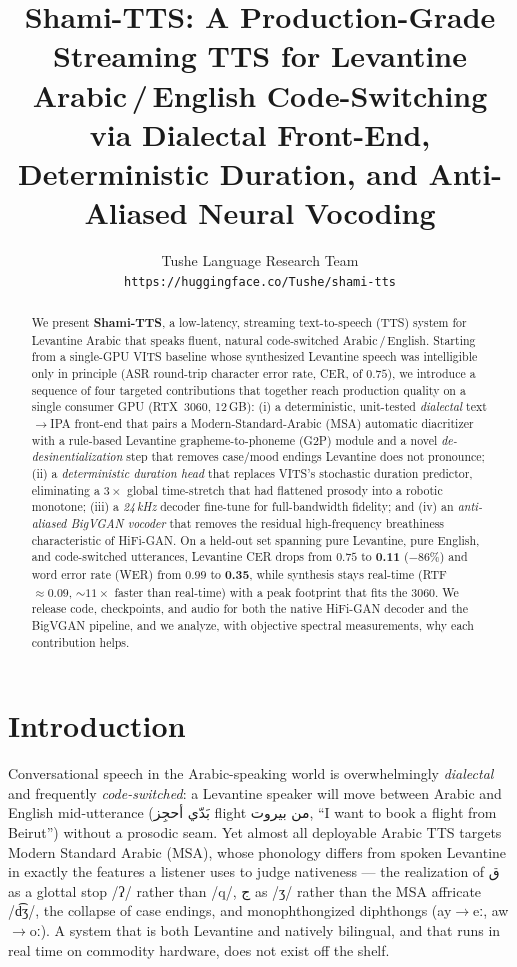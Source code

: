 \documentclass[10pt,twocolumn]{article}
\title{\vspace{-3.5em}\bfseries Shami-TTS: A Production-Grade Streaming TTS for
Levantine Arabic\,/\,English Code-Switching\\[0.2em]
\large via Dialectal Front-End, Deterministic Duration, and Anti-Aliased Neural Vocoding}
\author{Tushe Language Research Team\\ \small \texttt{https://huggingface.co/Tushe/shami-tts}}
\date{}
\newcommand{\ipa}[1]{{\ipafont #1}}
\newcommand{\ar}[1]{{\arabicfont #1}}
\newcommand{\best}[1]{\textbf{#1}}
\begin{document}
\maketitle

\begin{abstract}
\noindent
We present \textbf{Shami-TTS}, a low-latency, streaming text-to-speech (TTS) system for
Levantine Arabic that speaks fluent, natural code-switched Arabic\,/\,English. Starting
from a single-GPU VITS baseline whose synthesized Levantine speech was intelligible only
in principle (ASR round-trip character error rate, CER, of \(0.75\)), we introduce a
sequence of four targeted contributions that together reach production quality on a single
consumer GPU (RTX~3060, 12\,GB): (i) a deterministic, unit-tested \emph{dialectal}
text\(\rightarrow\)IPA front-end that pairs a Modern-Standard-Arabic (MSA) automatic
diacritizer with a rule-based Levantine grapheme-to-phoneme (G2P) module and a novel
\emph{de-desinentialization} step that removes case/mood endings Levantine does not
pronounce; (ii) a \emph{deterministic duration head} that replaces VITS's stochastic
duration predictor, eliminating a \(3\times\) global time-stretch that had flattened prosody
into a robotic monotone; (iii) a \emph{24\,kHz} decoder fine-tune for full-bandwidth
fidelity; and (iv) an \emph{anti-aliased BigVGAN vocoder} that removes the residual
high-frequency breathiness characteristic of HiFi-GAN. On a held-out set spanning
pure Levantine, pure English, and code-switched utterances, Levantine CER drops from
\(0.75\) to \best{0.11} (\(-86\%\)) and word error rate (WER) from \(0.99\) to \best{0.35},
while synthesis stays real-time (RTF~\(\approx\!0.09\), \(\sim\!11\times\) faster than
real-time) with a peak footprint that fits the 3060. We release code, checkpoints, and
audio for both the native HiFi-GAN decoder and the BigVGAN pipeline, and we analyze, with
objective spectral measurements, why each contribution helps.
\end{abstract}

\section{Introduction}
Conversational speech in the Arabic-speaking world is overwhelmingly \emph{dialectal} and
frequently \emph{code-switched}: a Levantine speaker will move between Arabic and English
mid-utterance (\ar{بَدّي أحجِز flight من بيروت}, ``I want to book a flight from Beirut'')
without a prosodic seam. Yet almost all deployable Arabic TTS targets Modern Standard
Arabic (MSA), whose phonology differs from spoken Levantine in exactly the features a
listener uses to judge nativeness --- the realization of \ar{ق} as a glottal stop
\ipa{/ʔ/} rather than \ipa{/q/}, \ar{ج} as \ipa{/ʒ/} rather than the MSA affricate
\ipa{/d͡ʒ/}, the collapse of case endings, and monophthongized diphthongs
(\ipa{ay\(\rightarrow\)eː}, \ipa{aw\(\rightarrow\)oː}). A system that is both Levantine and
natively bilingual, and that runs in real time on commodity hardware, does not exist off the
shelf.
\end{document}
